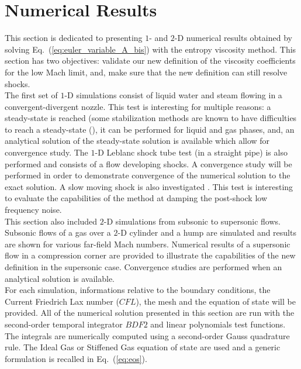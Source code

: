 \documentclass[preprint,10pt]{elsarticle}
\newcommand{\eqt}[1]{Eq.~(\ref{#1})}                     %
\begin{document}
\section{Numerical Results} \label{sec:results}
This section is dedicated to presenting $1$- and $2$-D numerical results obtained by solving \eqt{eq:euler_variable_A_bis} with the entropy viscosity method. This section has two objectives: validate our new definition of the viscosity coefficients for the low Mach limit, and, make sure that the new definition can still resolve shocks.\\
The first set of $1$-D simulations consist of liquid water and steam flowing in a convergent-divergent nozzle. This test is interesting for multiple reasons: a steady-state is reached (some stabilization methods are known to have difficulties to reach a steady-state (\cite{FluxLimiter, FluxLimiter2}), it can be performed for liquid and gas phases, and, an analytical solution of the steady-state solution is available which allow for convergence study. The $1$-D Leblanc shock tube test \cite{Leblanc} (in a straight pipe) is also performed and consists of a flow developing shocks. A convergence study will be performed in order to demonstrate convergence of the numerical solution to the exact solution. A slow moving shock is also investigated \cite{james}. This test is interesting to evaluate the capabilities of the method at damping the post-shock low frequency noise. \\ 
This section also included $2$-D simulations from subsonic to supersonic flows. Subsonic flows of a gas over a $2$-D cylinder and a hump \cite{Hump} are simulated and results are shown for various far-field Mach numbers. Numerical results of a supersonic flow in a compression corner are provided to illustrate the capabilities of the new definition in the supersonic case. Convergence studies are performed when an analytical solution is available. \\
For each simulation, informations relative to the boundary conditions, the Current Friedrich Lax number ($CFL$), the mesh and the equation of state will be provided. All of the numerical solution presented in this section are run with the second-order temporal integrator $BDF2$ and linear polynomials test functions. The integrals are numerically computed using a second-order Gauss quadrature rule. The Ideal Gas \cite{IGEOS} or Stiffened Gas equation of state \cite{SGEOS} are used and a generic formulation is recalled in \eqt{eq:eos}.
\end{document}
